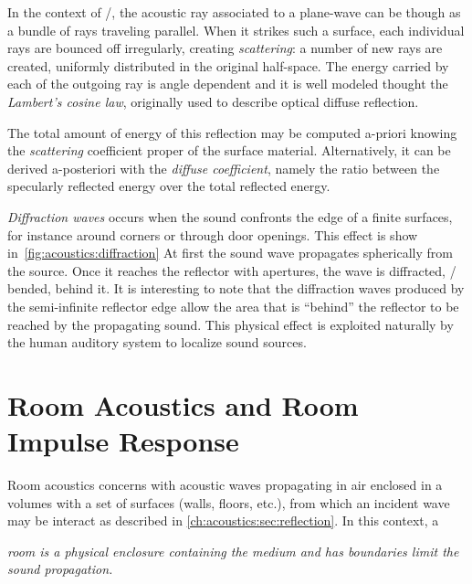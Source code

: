 In the context of \GA/, the acoustic ray associated to a plane-wave can be though as a bundle of rays traveling parallel.
When it strikes such a surface, each individual rays are bounced off irregularly, creating \textit{scattering}:
a number of new rays are created, uniformly distributed in the original half-space.
The energy carried by each of the outgoing ray is angle dependent and it
is well modeled thought the \textit{Lambert's cosine law}, originally used to describe optical diffuse reflection.

The total amount of energy of this reflection may be computed a-priori
knowing the \textit{scattering} coefficient proper of the surface material.
Alternatively, it can be derived a-posteriori with the \textit{diffuse coefficient}, namely the ratio between
the specularly reflected energy over the total reflected energy.

\textit{Diffraction waves} occurs when the sound confronts the edge of a finite surfaces, for instance around corners or through door openings.
This effect is show in~\cref{fig:acoustics:diffraction}
At first the sound wave propagates spherically from the source.
Once it reaches the reflector with apertures, the wave is diffracted, \ie/ bended, behind it.
It is interesting to note that the diffraction waves produced by the semi-infinite reflector edge
allow the area that is ``behind'' the reflector to be reached by the propagating sound.
This physical effect is exploited naturally by the human auditory system to localize sound sources.


\section{Room Acoustics and Room Impulse Response}\label{ch:acoustics:sec:rir}
Room acoustics concerns with acoustic waves propagating in air enclosed in a volumes with a set of surfaces
(walls, floors, etc.), from which an incident wave may be interact as described in \cref{ch:acoustics:sec:reflection}.
In this context, a
\begin{center}
    \textit{\emph{room} is a physical enclosure containing the medium and has boundaries limit the sound propagation.}
\end{center}

